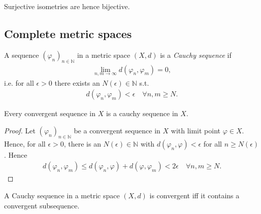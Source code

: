 \begin{remark}
	Surjective isometries are hence bijective.
\end{remark}

\subsection{Complete metric spaces}

\begin{defn}
	A sequence $(\varphi_n)_{n\in\mathbb N}$ in a metric space $(X, d)$ is a \textit{Cauchy sequence} if 
	\begin{align}
		\lim\limits_{n, m\to\infty} d(\varphi_n, \varphi_m) = 0,
	\end{align}
	i.e. for all $\epsilon > 0$ there exists an $N(\epsilon)\in \mathbb N$ s.t. 
	\begin{align}
		d(\varphi_n, \varphi_m) < \epsilon \quad\forall n, m\geq N.
	\end{align}
\end{defn}

\begin{theorem}\label{thrm:convergent_sequence_cauchy_sequence}
	Every convergent sequence in $X$ is a cauchy sequence in $X$.
\end{theorem}

\begin{proof}
	Let $(\varphi_n)_{n\in\mathbb N}$ be a convergent sequence in $X$ with limit point $\varphi\in X$. Hence, for all $\epsilon > 0$, there is an $N(\epsilon)\in\mathbb N$ with $d(\varphi_n, \varphi) < \epsilon$ for all $n\geq N(\epsilon)$. Hence
	\begin{align}
		d(\varphi_n, \varphi_m) \leq d(\varphi_n, \varphi) + d(\varphi, \varphi_m) < 2\epsilon \quad\forall n,m\geq N.
	\end{align}
\end{proof}

\begin{theorem}\label{thrm:cauchy_convergent_subsequence}
	A Cauchy sequence in a metric space $(X, d)$ is convergent iff it contains a convergent subsequence.
\end{theorem}

